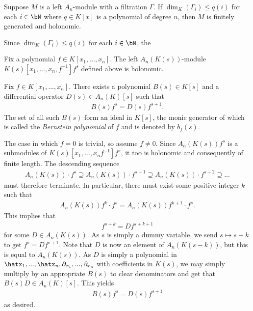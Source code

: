 \begin{lem}\label{lem:bounded-filtration-holonomic}
	Suppose $M$ is a left $A_n$-module with a filtration $\Gamma$. If $\dim_K(\Gamma_i) \leq q(i)$ for each $i \in \bN$ where $q \in K[x]$ is a polynomial of degree $n$, then $M$ is finitely generated and holonomic.
\end{lem}
\begin{prf}
	Since $\dim_K(\Gamma_i) \leq q(i)$ for each $i \in \bN$, the 
\end{prf}
\begin{cor}\label{lem:}
	Fix a polynomial $f \in K[x_1,...,x_n]$. The left $A_n(K(s))$-module $K(s)[x_1,...,x_n,f^{-1}]f^s$ defined above is holonomic.
\end{cor}
\begin{prf}
	
\end{prf}
\begin{thm}\label{thm:b-functions-Weyl}
	Fix $f \in K[x_1,...,x_n]$. There exists a polynomial $B(s) \in K[s]$ and a differential operator $D(s)\in A_n(K)[s]$ such that
	\begin{align*}
		B(s)f^s = D(s) f^{s+1}.
	\end{align*}
	The set of all such $B(s)$ form an ideal in $K[s]$, the monic generator of which is called the \emph{Bernstein polynomial} of $f$ and is denoted by $b_f(s)$.
\end{thm}
\begin{prf}
	The case in which $f = 0$ is trivial, so assume $f\neq 0$. Since $A_n(K(s))f^s$ is a submodules of $K(s)[x_1,...,x_nf^{-1}]f^s$, it too is holonomic and consequently of finite length. The descending sequence
	\begin{align*}
		A_n(K(s))\cdot f^s \supseteq A_n(K(s))\cdot f^{s+1} \supseteq A_n(K(s))\cdot f^{s+2} \supseteq ...
	\end{align*}
	must therefore terminate. In particular, there must exist some positive integer $k$ such that
	\begin{align*}
		A_n(K(s))f^k\cdot f^s = A_n(K(s))f^{k+1}\cdot f^s.
	\end{align*}
	This implies that
	\begin{align*}
		f^{s+k} = Df^{s+k+1}
	\end{align*}
	for some $D \in A_n(K(s))$. As $s$ is simply a dummy variable, we send $s\mapsto s - k$ to get $f^s = Df^{s+1}$. Note that $D$ is now an element of $A_n(K(s-k))$, but this is equal to $A_n(K(s))$. As $D$ is simply a polynomial in $\hatx_1,...,\hatx_n,\partial_{x_1},...,\partial_{x_n}$ with coefficients in $K(s)$, we may simply multiply by an appropriate $B(s)$ to clear denominators and get that $B(s)D \in A_n(K)[s]$. This yields
	\begin{align*}
		B(s)f^s = D(s)f^{s+1}
	\end{align*}
	as desired.
\end{prf}
